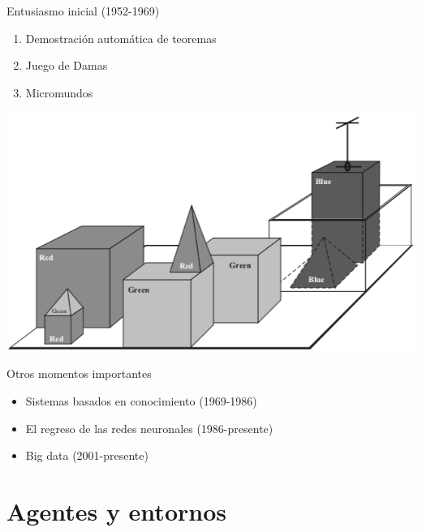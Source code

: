 \documentclass[11pt]{beamer}
\begin{document}
\begin{frame}{Entusiasmo inicial (1952-1969)}

\begin{minipage}{.45\linewidth}

\begin{enumerate}
\item Demostración automática de teoremas
\item Juego de Damas
\item Micromundos
\end{enumerate}

\end{minipage}\hspace{.5cm}\begin{minipage}{.5\linewidth}

\includegraphics[scale=.2]{imagenes/micromundos}

\end{minipage}


\end{frame}


\begin{frame}{Otros momentos importantes}

\begin{itemize}
\item  Sistemas basados en conocimiento (1969-1986)
\item El regreso de las redes neuronales (1986-presente)
\item Big data (2001-presente)
\end{itemize}

\end{frame}


\section{Agentes y entornos}
\end{document}
